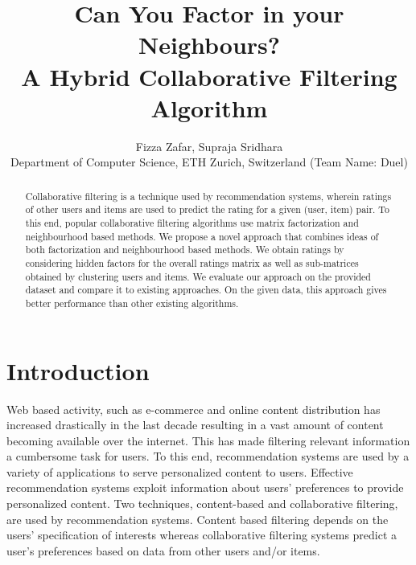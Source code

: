 \documentclass[10pt,conference,compsocconf]{IEEEtran}
\begin{document}
\title{Can You Factor in your Neighbours? \\
\large A Hybrid Collaborative Filtering Algorithm}
\author{
  Fizza Zafar, Supraja Sridhara\\
  Department of Computer Science, ETH Zurich, Switzerland (Team Name: Duel)
}

\maketitle 

\begin{abstract}
Collaborative filtering is a technique used by recommendation systems, wherein ratings of other users and items are used to predict the rating for a given (user, item) pair. To this end, popular collaborative filtering algorithms use matrix factorization and neighbourhood based methods. We propose a novel approach that combines ideas of both factorization and neighbourhood based methods. We obtain ratings by considering hidden factors for the overall ratings matrix as well as sub-matrices obtained by clustering users and items. We evaluate our approach on the provided dataset and compare it to existing approaches. On the given data, this approach gives better performance than other existing algorithms. 
\end{abstract}

\section{Introduction}
Web based activity, such as e-commerce and online content distribution has increased drastically in the last decade resulting in a vast amount of content becoming available over the internet. This has made filtering relevant information a cumbersome task for users. To this end, recommendation systems are used by a variety of applications to serve personalized content to users. Effective recommendation systems exploit information about users' preferences to provide personalized content. Two techniques, content-based and collaborative filtering, are used by recommendation systems. Content based filtering depends on the users' specification of interests whereas collaborative filtering systems predict a user's preferences based on data from other users and/or items.
\end{document}
